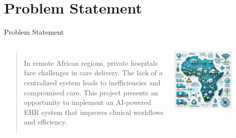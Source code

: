 \documentclass[aspectratio=169]{beamer}
\begin{document}
\section{Problem Statement}
\begin{frame}{Problem Statement}
    \begin{columns}[T]
            \begin{quote}
                \large In remote African regions, private hospitals face challenges in care delivery. The lack of a centralized system leads to inefficiencies and compromised care. This project presents an opportunity to implement an AI-powered EHR system that improves clinical workflows and efficiency.
            \end{quote}
            

            \includegraphics[width=0.7\textwidth]{problem_illustration.png}
    \end{columns}
    \vspace{0.1cm}
\end{frame}

\end{document}
